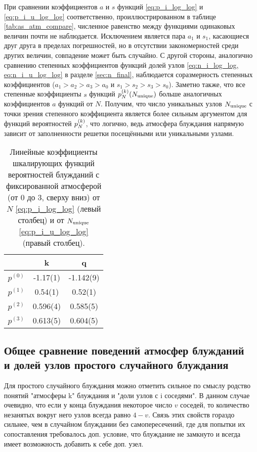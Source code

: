 При сравнении коэффициентов $a$ и $s$ функций \eqref{eq:p_i_log_log} и \eqref{eq:p_i_u_log_log} соответственно, проиллюстрированном в таблице \ref{tab:as_atm_compare}, численное равенство между функциями одинаковых величин почти не наблюдается.
Исключением является пара $a_1$ и $s_1$, касающиеся друг друга в пределах погрешностей, но в отсутствии закономерностей среди других величин, совпадение может быть случайно.
С другой стороны, аналогично сравнению степенных коэффициентов функций долей узлов \eqref{eq:n_i_log_log, eq:n_i_u_log_log} в разделе \ref{sec:n_final}, наблюдается соразмерность степенных коэффициентов ($a_1 > a_2 > a_3 > a_0$ и $s_1 > s_2 > s_3 > s_0$). 
Заметно также, что все степенные коэффициенты $s$ функций $p^{(k)}_N(N_{\textup{unique}})$ больше аналогичных коэффициентов $a$ функций от $N$.
Получим, что число уникальных узлов $N_{\textup{unique}}$ с точки зрения степенного коэффициента является более сильным аргументом для функций вероятностей $p^{(k)}_N$, что логично, ведь атмосфера блуждания напрямую зависит от заполненности решетки посещёнными или уникальными узлами.



\begin{table}[h]
\centering
\begin{tabular}{|c|c|c|}
\hline
 & k & q \\ \hline
$p^{(0)}$ & -1.17(1) &  -1.142(9) \\ \hline
$p^{(1)}$ & 0.54(1) & 0.52(1) \\ \hline
$p^{(2)}$ & 0.596(4) & 0.585(5) \\ \hline
$p^{(3)}$ & 0.613(5) & 0.604(5) \\ \hline
\end{tabular}
\caption{Линейные коэффициенты шкалирующих функций вероятностей блужданий с фиксированной атмосферой (от 0 до 3, сверху вниз) от $N$ \eqref{eq:p_i_log_log} (левый столбец) и от $N_{\textup{unique}}$ \eqref{eq:p_i_u_log_log} (правый столбец).}
\label{tab:kq_atm_compare}
\end{table}


\newpage

\subsection{Общее сравнение поведений атмосфер блужданий и долей узлов простого случайного блуждания}

Для простого случайного блуждания можно отметить сильное по смыслу родство понятий "атмосферы k" блуждания и "доли узлов с i соседями". 
В данном случае очевидно, что если у конца блуждания некоторое число $v$ соседей, то количество незанятых вокруг него узлов всегда равно $4-v$. 
Связь этих свойств гораздо сильнее, чем в случайном блуждании без самопересечений, где для попытки их сопоставления требовалось доп. условие, что блуждание не замкнуто и всегда имеет возможность добавить к себе доп. узел.

